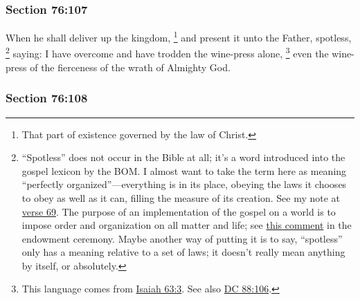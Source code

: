 
	\subsubsection{Section 76:107} %
		\label{DC76-107}

		When he shall deliver up the kingdom,%
			\footnote{%
				That part of existence governed by the law of Christ.
				}
		and present it unto the Father, spotless,%
			\footnote{%
				``Spotless'' does not occur in the Bible at all; it's a word introduced into the gospel lexicon by the BOM. I almost want to take the term here as meaning ``perfectly organized''---everything is in its place, obeying the laws it chooses to obey as well as it can, filling the measure of its creation. See my note at \hyperref[DC76-69]{verse 69}. The purpose of an implementation of the gospel on a world is to impose order and organization on all matter and life; see \hyperref[ENDOWMENT-MEASURE]{this comment} in the endowment ceremony. Maybe another way of putting it is to say, ``spotless'' only has a meaning relative to a set of laws; it doesn't really mean anything by itself, or absolutely.
				}
		saying: I have overcome and have trodden the wine-press alone,%
			\footnote{%
				This language comes from \hyperref[ISAIAH-63-3]{Isaiah 63:3}. See also \hyperref[DC88-106]{DC 88:106}.
				}
		even the wine-press of the fierceness of the wrath of Almighty God.


	\subsubsection{Section 76:108} %
		\label{DC76-108}


